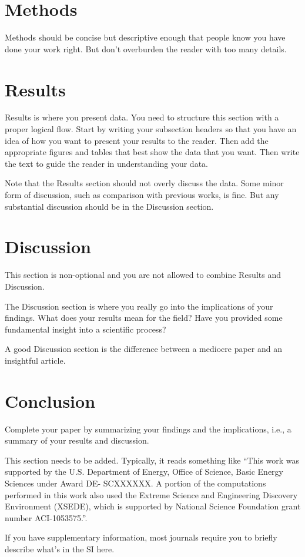 \documentclass[manuscript=article]{achemso}
\begin{document}
\section{Methods}

Methods should be concise but descriptive enough that people know you have done your work right. But don't overburden the reader with too many details. 

\section{Results}

Results is where you present data. You need to structure this section with a proper logical flow. Start by writing your subsection headers so that you have an idea of how you want to present your results to the reader. Then add the appropriate figures and tables that best show the data that you want. Then write the text to guide the reader in understanding your data. 

Note that the Results section should not overly discuss the data. Some minor form of discussion, such as comparison with previous works, is fine. But any substantial discussion should be in the Discussion section.

\section{Discussion}

This section is non-optional and you are not allowed to combine Results and Discussion. 

The Discussion section is where you really go into the implications of your findings. What does your results mean for the field? Have you provided some fundamental insight into a scientific process? 

A good Discussion section is the difference between a mediocre paper and an insightful article.

\section{Conclusion}

Complete your paper by summarizing your findings and the implications, i.e., a summary of your results and discussion.

\begin{acknowledgement}

This section needs to be added. Typically, it reads something like ``This work was supported by the U.S. Department of Energy, Office of Science, Basic Energy Sciences under Award DE- SCXXXXXX. A portion of the computations performed in this work also used the Extreme Science and Engineering Discovery Environment (XSEDE), which is supported by National Science Foundation grant number ACI-1053575.''.

\end{acknowledgement}

\begin{suppinfo}
 
If you have supplementary information, most journals require you to briefly describe what's in the SI here. 

\end{suppinfo}

%

\clearpage

\listoffigures
\end{document}
